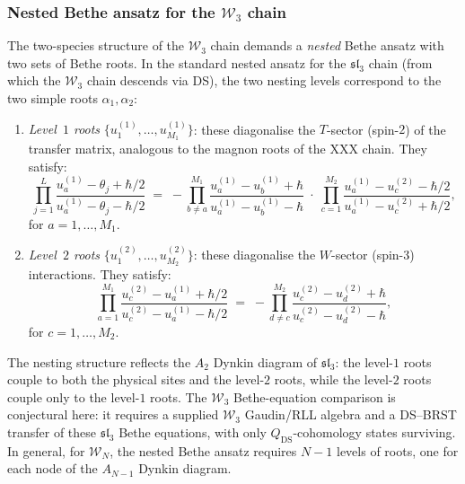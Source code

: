 \subsubsection{Nested Bethe ansatz for the $\mathcal{W}_3$ chain}

\begin{construction}
\label{constr:w3-bethe-ansatz}
%
%
The two-species structure of the $\mathcal{W}_3$ chain demands
a \emph{nested} Bethe ansatz with two sets of Bethe roots.
In the standard nested ansatz for the
$\mathfrak{sl}_3$ chain (from which the $\mathcal{W}_3$
chain descends via DS), the two nesting levels correspond to
the two simple roots $\alpha_1, \alpha_2$:
\begin{enumerate}[label=\textup{(\roman*)}]
\item \emph{Level~$1$ roots}
 $\{u_1^{(1)}, \ldots, u_{M_1}^{(1)}\}$: these diagonalise
 the $T$-sector (spin-$2$) of the transfer matrix, analogous
 to the magnon roots of the XXX chain. They satisfy:
 \begin{equation}
 \label{eq:bethe-level-1}
 \prod_{j=1}^{L}
 \frac{u_a^{(1)} - \theta_j + \hbar/2}
 {u_a^{(1)} - \theta_j - \hbar/2}
 \;=\;
 -\prod_{b \ne a}^{M_1}
 \frac{u_a^{(1)} - u_b^{(1)} + \hbar}
 {u_a^{(1)} - u_b^{(1)} - \hbar}
 \;\cdot\;
 \prod_{c=1}^{M_2}
 \frac{u_a^{(1)} - u_c^{(2)} - \hbar/2}
 {u_a^{(1)} - u_c^{(2)} + \hbar/2},
 \end{equation}
 for $a = 1, \ldots, M_1$.

\item \emph{Level~$2$ roots}
 $\{u_1^{(2)}, \ldots, u_{M_2}^{(2)}\}$: these diagonalise
 the $W$-sector (spin-$3$) interactions. They satisfy:
 \begin{equation}
 \label{eq:bethe-level-2}
 \prod_{a=1}^{M_1}
 \frac{u_c^{(2)} - u_a^{(1)} + \hbar/2}
 {u_c^{(2)} - u_a^{(1)} - \hbar/2}
 \;=\;
 -\prod_{d \ne c}^{M_2}
 \frac{u_c^{(2)} - u_d^{(2)} + \hbar}
 {u_c^{(2)} - u_d^{(2)} - \hbar},
 \end{equation}
 for $c = 1, \ldots, M_2$.
\end{enumerate}

The nesting structure reflects the $A_2$ Dynkin diagram of
$\mathfrak{sl}_3$: the level-$1$ roots couple to both the
physical sites and the level-$2$ roots, while the level-$2$
roots couple only to the level-$1$ roots. The
$\mathcal{W}_3$ Bethe-equation comparison is conjectural here: it
requires a supplied $\mathcal W_3$ Gaudin/RLL algebra and a DS--BRST
transfer of these $\mathfrak{sl}_3$ Bethe equations, with only
$Q_{\mathrm{DS}}$-cohomology states surviving. In general, for
$\mathcal{W}_N$, the nested Bethe ansatz requires $N - 1$
levels of roots, one for each node of the $A_{N-1}$ Dynkin
diagram.
\end{construction}

